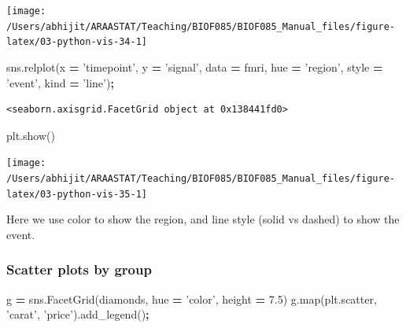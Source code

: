 \documentclass[
  letterpaper,
]{scrbook}
\newenvironment{Shaded}{\begin{snugshade}}{\end{snugshade}}
\newcommand{\BuiltInTok}[1]{#1}
\newcommand{\FloatTok}[1]{\textcolor[rgb]{0.00,0.00,0.81}{#1}}
\newcommand{\NormalTok}[1]{#1}
\newcommand{\OperatorTok}[1]{\textcolor[rgb]{0.81,0.36,0.00}{\textbf{#1}}}
\newcommand{\StringTok}[1]{\textcolor[rgb]{0.31,0.60,0.02}{#1}}
\begin{document}
\begin{center}\texttt{[image: /Users/abhijit/ARAASTAT/Teaching/BIOF085/BIOF085\_Manual\_files/figure-latex/03-python-vis-34-1]} \end{center}

\begin{Shaded}
\begin{Highlighting}[]
\NormalTok{sns.relplot(x }\OperatorTok{=} \StringTok{'timepoint'}\NormalTok{, y }\OperatorTok{=} \StringTok{'signal'}\NormalTok{, data }\OperatorTok{=}\NormalTok{ fmri, hue }\OperatorTok{=} \StringTok{'region'}\NormalTok{, }
\NormalTok{            style }\OperatorTok{=} \StringTok{'event'}\NormalTok{, kind }\OperatorTok{=} \StringTok{'line'}\NormalTok{)}\OperatorTok{;}
\end{Highlighting}
\end{Shaded}

\begin{verbatim}
<seaborn.axisgrid.FacetGrid object at 0x138441fd0>
\end{verbatim}

\begin{Shaded}
\begin{Highlighting}[]
\NormalTok{plt.show()}
\end{Highlighting}
\end{Shaded}

\begin{center}\texttt{[image: /Users/abhijit/ARAASTAT/Teaching/BIOF085/BIOF085\_Manual\_files/figure-latex/03-python-vis-35-1]} \end{center}

Here we use color to show the region, and line style (solid vs dashed) to show the event.

\hypertarget{scatter-plots-by-group}{%
\subsubsection{Scatter plots by group}\label{scatter-plots-by-group}}

\begin{Shaded}
\begin{Highlighting}[]
\NormalTok{g }\OperatorTok{=}\NormalTok{ sns.FacetGrid(diamonds, hue }\OperatorTok{=} \StringTok{'color'}\NormalTok{, height }\OperatorTok{=} \FloatTok{7.5}\NormalTok{)}
\NormalTok{g.}\BuiltInTok{map}\NormalTok{(plt.scatter, }\StringTok{'carat'}\NormalTok{, }\StringTok{'price'}\NormalTok{).add_legend()}\OperatorTok{;}
\end{Highlighting}
\end{Shaded}
\end{document}
